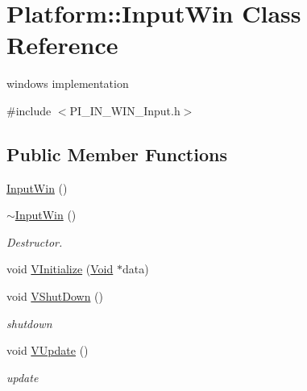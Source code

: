 \hypertarget{classPlatform_1_1InputWin}{
\section{Platform::InputWin Class Reference}
\label{classPlatform_1_1InputWin}
}


windows implementation  


{\ttfamily \#include $<$PI\_\-IN\_\-WIN\_\-Input.h$>$}\subsection*{Public Member Functions}
\begin{Indent}{\bf }\par
{\em \label{_amgrpd41d8cd98f00b204e9800998ecf8427e}
 }\begin{DoxyCompactItemize}
\item 
\hyperlink{classPlatform_1_1InputWin_a18720756c7fd9150c87c5e0f074de6ac}{InputWin} ()
\item 
\hypertarget{classPlatform_1_1InputWin_aa73cf0eb513465cba82ede242f9f3d97}{
\hyperlink{classPlatform_1_1InputWin_aa73cf0eb513465cba82ede242f9f3d97}{$\sim$InputWin} ()}
\label{classPlatform_1_1InputWin_aa73cf0eb513465cba82ede242f9f3d97}

\begin{DoxyCompactList}\small\item\em Destructor. \item\end{DoxyCompactList}\item 
void \hyperlink{classPlatform_1_1InputWin_a37abaf8a29a636f6cc3824ec215a993d}{VInitialize} (\hyperlink{structVoid}{Void} $\ast$data)
\item 
\hypertarget{classPlatform_1_1InputWin_a1a329dc0ce6b874e5e134bd20e232630}{
void \hyperlink{classPlatform_1_1InputWin_a1a329dc0ce6b874e5e134bd20e232630}{VShutDown} ()}
\label{classPlatform_1_1InputWin_a1a329dc0ce6b874e5e134bd20e232630}

\begin{DoxyCompactList}\small\item\em shutdown \item\end{DoxyCompactList}\item 
\hypertarget{classPlatform_1_1InputWin_ac41b8eb8f931be4c2a760658fc2747c9}{
void \hyperlink{classPlatform_1_1InputWin_ac41b8eb8f931be4c2a760658fc2747c9}{VUpdate} ()}
\label{classPlatform_1_1InputWin_ac41b8eb8f931be4c2a760658fc2747c9}

\begin{DoxyCompactList}\small\item\em update \item\end{DoxyCompactList}\end{DoxyCompactItemize}
\end{Indent}


